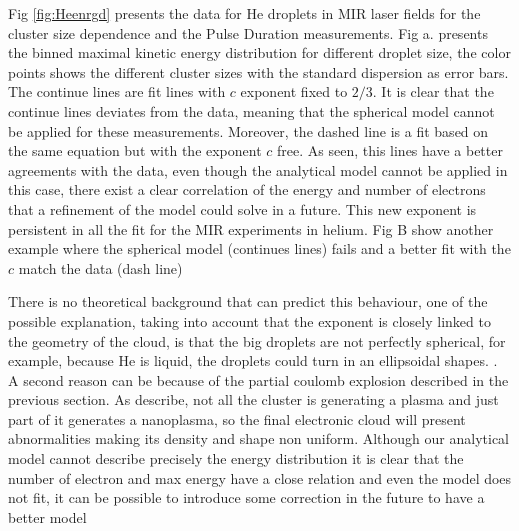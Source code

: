 Fig \ref{fig:Heenrgd} presents the data for He droplets in MIR laser fields for the cluster size dependence and the Pulse Duration measurements. Fig a. presents the binned maximal kinetic energy distribution for different droplet size, the color points shows the different cluster sizes with the standard dispersion as error bars. The continue lines are fit lines with $c$ exponent fixed to $2/3$. It is clear that the continue lines deviates from the data, meaning that the spherical model cannot be applied for these measurements. Moreover, the dashed line is a fit based on the same equation but with the exponent $c$ free. As seen, this lines have a better agreements with the data, even though the analytical model cannot be applied in this case, there exist a clear correlation of the energy and number of electrons that a refinement of the model could solve in a future. This new exponent is persistent in all the fit for the MIR experiments in helium.  Fig B show another example where the spherical model (continues lines) fails and a better fit with the $c$ match the data (dash line)

There is no theoretical background that can predict this behaviour, one of the possible explanation, taking into account that the exponent is closely linked to the geometry of the cloud, is that the big droplets are not perfectly spherical, for example, because He is liquid, the droplets could turn in an ellipsoidal shapes. . A second reason can be because of the partial coulomb explosion described in the previous section. As describe, not all the cluster is generating a plasma and just part of it generates a nanoplasma, so the final electronic cloud will present abnormalities making its density and shape non uniform. Although our analytical model cannot describe precisely the energy distribution it is clear that the number of electron and max energy have a close relation and even the model does not fit, it can be possible to introduce some correction in the future to have a better model

